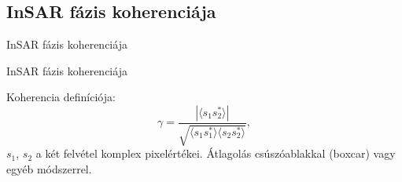 \def\ft{InSAR fázis koherenciája}
\subsection{\ft}

\begin{frame}{\ft}
    \begin{minic}{0.75}
    \end{minic}
\end{frame}


\begin{frame}{\ft}
    \begin{minipage}[c]{0.5\textwidth}
    \end{minipage}
    \hspace{10pt}
    \begin{minipage}[c]{0.4\textwidth}
    Koherencia definíciója:
    $$ \gamma = \frac{|\langle s_1 s_2^* \rangle|}{\sqrt{\langle s_1 s_1^*
        \rangle \langle s_2 s_2^* \rangle}}, $$
    $s_1$, $s_2$ a két felvétel komplex pixelértékei. Átlagolás csúszóablakkal (boxcar) vagy egyéb módszerrel.
    \end{minipage}

\end{frame}
